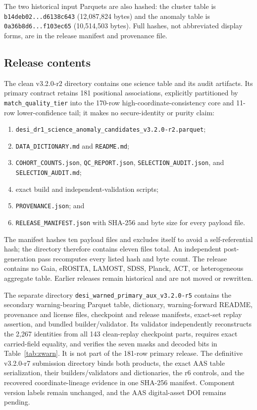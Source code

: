 \documentclass[twocolumn,linenumbers]{aastex702}
\newcommand{\releaseVersion}{v3.2.0-r2}
\newcommand{\bundleVersion}{v3.2.0-r7}
\begin{document}
The two historical input Parquets are also hashed: the cluster table is
\texttt{b14deb02...d6138c643} (12,087,824 bytes) and the anomaly table is
\texttt{0a36b8d6...f103ec65} (10,514,503 bytes).  Full hashes, not abbreviated display forms, are in
the release manifest and provenance file.

\subsection{Release contents}\label{sec:release}

The clean \releaseVersion{} directory contains one science table and its audit artifacts.  Its
primary contract retains 181 positional associations, explicitly partitioned by
\texttt{match\_quality\_tier} into the 170-row high-coordinate-consistency core and 11-row
lower-confidence tail; it makes no secure-identity or purity claim:
\begin{enumerate}
\item \nolinkurl{desi_dr1_science_anomaly_candidates_v3.2.0-r2.parquet};
\item \texttt{DATA\_DICTIONARY.md} and \texttt{README.md};
\item \nolinkurl{COHORT_COUNTS.json}, \nolinkurl{QC_REPORT.json},
\nolinkurl{SELECTION_AUDIT.json}, and \nolinkurl{SELECTION_AUDIT.md};
\item exact build and independent-validation scripts;
\item \texttt{PROVENANCE.json}; and
\item \texttt{RELEASE\_MANIFEST.json} with SHA-256 and byte size for every payload file.
\end{enumerate}
The manifest hashes ten payload files and excludes itself to avoid a self-referential hash;
the directory therefore contains eleven files total.  An independent post-generation
pass recomputes every listed hash and byte count.  The release contains no Gaia, eROSITA, LAMOST,
SDSS, Planck, ACT, or heterogeneous aggregate table.  Earlier releases remain historical and are
not moved or rewritten.

The separate directory \nolinkurl{desi_warned_primary_aux_v3.2.0-r5} contains the secondary
warning-bearing Parquet table, dictionary, warning-forward README, provenance and license files,
checkpoint and release manifests, exact-set replay assertion, and bundled builder/validator.
Its validator independently reconstructs the 2,267 identities from all 143 clean-replay
checkpoint parts, requires exact carried-field equality, and verifies the seven masks and decoded
bits in Table~\ref{tab:zwarn}.  It is not part of the 181-row primary release.  The definitive
\bundleVersion{} submission directory binds both products, the exact AAS table serialization,
their builders/validators and dictionaries, the r6 controls, and the recovered coordinate-lineage
evidence in one SHA-256 manifest.  Component version labels remain unchanged, and the AAS
digital-asset DOI remains pending.
\end{document}
